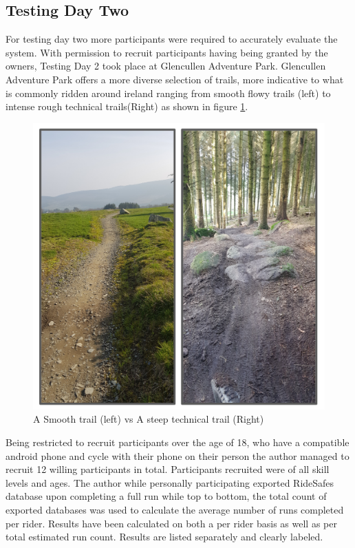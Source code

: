 \subsection*{Testing Day Two}

For testing day two more participants were required to accurately evaluate the system.
With permission to recruit participants having being granted by the owners, Testing Day 2 took place at Glencullen Adventure Park. Glencullen Adventure Park offers a more diverse selection of trails, more indicative to what is commonly ridden around ireland ranging from smooth flowy trails (left) to intense rough technical trails(Right) as shown in figure \ref{trail}.


\begin{figure}[h]
      \centering
      \includegraphics[scale = .5]{evaluation/trails.png}
      \caption{A Smooth trail (left) vs A steep technical trail (Right)}
      \label{trail}
\end{figure}


Being restricted to recruit participants over the age of 18, who have a compatible android phone and cycle with their phone on their person the author managed to recruit 12 willing participants in total. Participants recruited were of all skill levels and ages. The author while personally participating exported RideSafes database upon completing a full run while top to bottom, the total count of exported databases was used to calculate the average number of runs completed per rider. Results have been calculated on both a per rider basis as well as per total estimated run count.  Results are listed separately and clearly labeled. 
  



